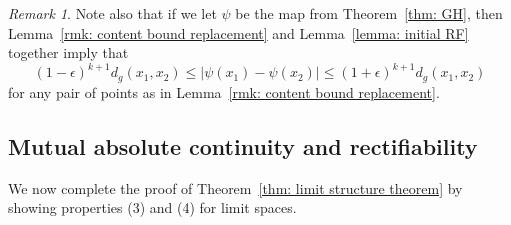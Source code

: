 \documentclass[11pt,reqno]{amsart}
\theoremstyle{remark}
\newtheorem{remark}[theorem]{Remark}
\theoremstyle{definition}
\numberwithin{equation}{section}
\newcommand{\e}{{\epsilon}}
\begin{document}
\begin{remark}\label{rmk: A}
	{\rm 
Note  also that if we let $\psi$ be the map from Theorem~\ref{thm: GH}, then Lemma~\ref{rmk: content bound replacement} and Lemma~\ref{lemma: initial RF} together imply that
	\begin{equation}\label{eqn: lip large scales 2}
		(1-\e)^{k+1} d_{g}(x_1,x_2) \leq |\psi(x_1)-\psi(x_2)|\leq 
		(1+\e)^{k+1} d_{g}(x_1,x_2)
	\end{equation}
for any pair of points as in Lemma~\ref{rmk: content bound replacement}. 
}
\end{remark}
\subsection{Mutual absolute continuity and rectifiability}\label{ss:4.3}
We now complete the proof of Theorem~\ref{thm: limit structure theorem} by showing properties (3) and (4) for limit spaces.
\end{document}

